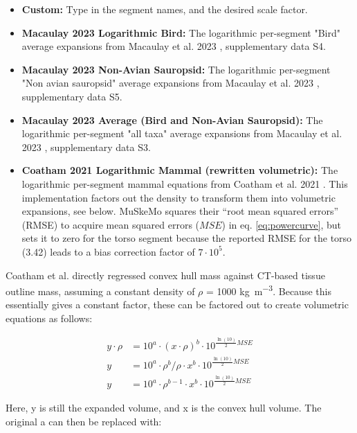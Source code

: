 \documentclass{article}
\begin{document}
\begin{itemize}
    \item \textbf{Custom:} Type in the segment names, and the desired scale factor.
    \item \textbf{Macaulay 2023 Logarithmic Bird:} The logarithmic per-segment "Bird" average expansions from Macaulay et al. 2023 \cite{macaulayDecouplingBodyShape2023}, supplementary data S4.
    \item \textbf{Macaulay 2023 Non-Avian Sauropsid:} The logarithmic per-segment "Non avian sauropsid" average expansions from Macaulay et al. 2023 \cite{macaulayDecouplingBodyShape2023}, supplementary data S5.
    \item \textbf{Macaulay 2023 Average (Bird and Non-Avian Sauropsid):} The logarithmic per-segment "all taxa" average expansions from Macaulay et al. 2023 \cite{macaulayDecouplingBodyShape2023}, supplementary data S3.
    \item \textbf{Coatham 2021 Logarithmic Mammal (rewritten volumetric):} The logarithmic per-segment mammal equations from Coatham et al. 2021 \cite{coathamConvexHullEstimation2021}. This implementation factors out the density to transform them into volumetric expansions, see below. MuSkeMo squares their ``root mean squared errors'' (RMSE) to acquire mean squared errors ($MSE$) in eq. \ref{eq:powercurve}, but sets it to zero for the torso segment because the reported RMSE for the torso (3.42) leads to a bias correction factor of \(7 \cdot 10^{5}\).
\end{itemize}


Coatham et al. directly regressed convex hull mass against CT-based tissue outline mass, assuming a constant density of \(\rho\) = 1000 \si{kg m^{-3}}. Because this essentially gives a constant factor, these can be factored out to create volumetric equations as follows:

\begin{equation}
\begin{aligned}
y \cdot \rho &= 10^a \cdot (x \cdot \rho )^{b} \cdot 10^{\frac{\ln(10)}{2} MSE } \\
y &= 10^a \cdot \rho^{b} / \rho  \cdot x^{b} \cdot 10^{\frac{\ln(10)}{2} MSE } \\
y &= 10^a \cdot \rho^{b - 1} \cdot x^{b} \cdot 10^{\frac{\ln(10)}{2} MSE }
\end{aligned}
\end{equation}


Here, y is still the expanded volume, and x is the convex hull volume. The original a can then be replaced with: 
\end{document}

